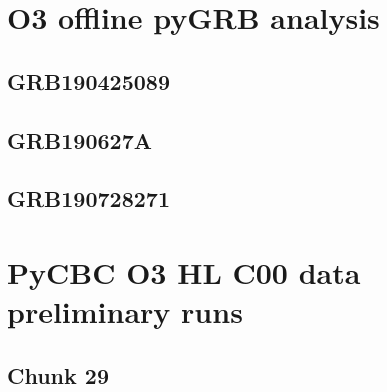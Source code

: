 \documentclass[binding=0.6cm, LaM]{sapthesis}
\begin{document}
		\begin{figure}[H]
                        \noindent
                        \label{pointinj}
                        \centering
                        \caption{}
                        \label{fig:pointinj}
                \end{figure}

\section{O3 offline pyGRB analysis}

\subsection{GRB190425089}

\subsection{GRB190627A}

\subsection{GRB190728271}

\section{PyCBC O3 HL C00 data preliminary runs}

\subsection{Chunk 29}
\end{document}
